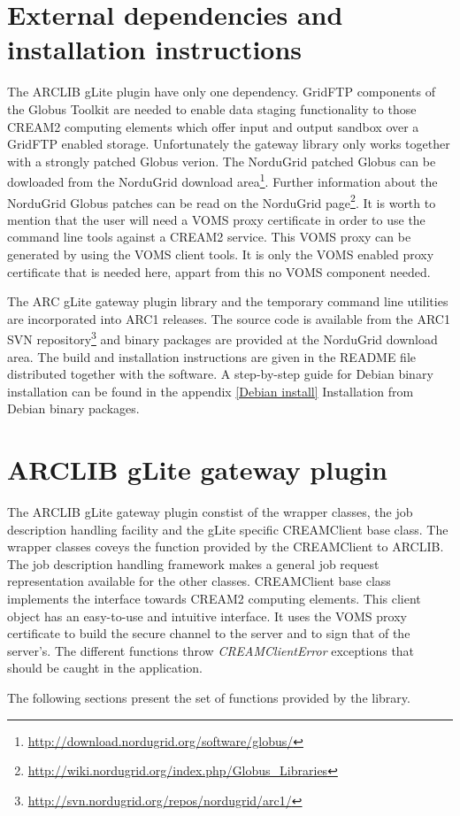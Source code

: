 \documentclass{article}
\begin{document}
\section{External dependencies and installation instructions}
\label{External dependencies and installation instructions}
The ARCLIB gLite plugin have only one dependency. GridFTP components of the Globus Toolkit\cite{globus} are needed to enable data staging functionality to those CREAM2 computing elements which offer input and output sandbox over a GridFTP enabled storage. Unfortunately the gateway library only works together with a strongly patched Globus verion. The NorduGrid patched Globus can be dowloaded from the NorduGrid download area\footnote{\url{http://download.nordugrid.org/software/globus/}}. Further information about the NorduGrid Globus patches can be read on the NorduGrid page\footnote{\url{http://wiki.nordugrid.org/index.php/Globus\_Libraries}}. It is worth to mention that the user will need a VOMS\cite{voms} proxy certificate in order to use the command line tools against a CREAM2 service. This VOMS proxy can be generated by using the VOMS client tools. It is only the VOMS enabled proxy certificate that is needed here, appart from this no VOMS component needed.\par
The ARC gLite gateway plugin library and the temporary command line utilities are incorporated into ARC1 releases. The source code is available from the ARC1 SVN repository\footnote{\url{http://svn.nordugrid.org/repos/nordugrid/arc1/}} and binary packages are provided at the NorduGrid download area. The build and installation instructions are given in the README file distributed together with the software. A step-by-step guide for Debian binary installation can be found in the appendix \ref{Debian install} Installation from Debian binary packages.
\section{ARCLIB gLite gateway plugin}
\label{ARCLIB gLite gateway plugin}
The ARCLIB gLite gateway plugin constist of the wrapper classes, the job description handling facility and the gLite specific CREAMClient base class. The wrapper classes coveys the function provided by the CREAMClient to ARCLIB. The job description handling framework makes a general job request representation available for the other classes. CREAMClient base class implements the interface towards CREAM2 computing elements.
This client object has an easy-to-use and intuitive interface. It uses the VOMS proxy certificate to build the secure channel to the server and to sign that of the server's.
The different functions throw \textit{CREAMClientError} exceptions that should be caught in the application.\par
The following sections present the set of functions provided by the library.\par
\end{document}
